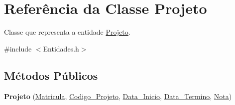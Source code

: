 \hypertarget{class_projeto}{
\section{\-Referência da \-Classe \-Projeto}
\label{class_projeto}
}


\-Classe que representa a entidade \hyperlink{class_projeto}{\-Projeto}.  




{\ttfamily \#include $<$\-Entidades.\-h$>$}

\subsection*{\-Métodos \-Públicos}
\begin{DoxyCompactItemize}
\item 
\hypertarget{class_projeto_ab39919e206b2e33b6ab00bfa3bacd9a5}{
{\bfseries \-Projeto} (\hyperlink{class_matricula}{\-Matricula}, \hyperlink{class_codigo___projeto}{\-Codigo\-\_\-\-Projeto}, \hyperlink{class_data___inicio}{\-Data\-\_\-\-Inicio}, \hyperlink{class_data___termino}{\-Data\-\_\-\-Termino}, \hyperlink{class_nota}{\-Nota})}
\label{class_projeto_ab39919e206b2e33b6ab00bfa3bacd9a5}


\end{DoxyCompactItemize}
